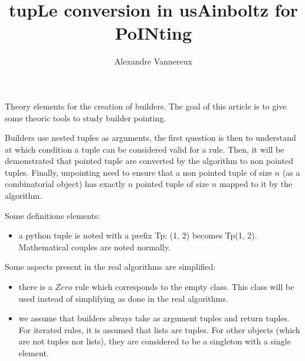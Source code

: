 \documentclass{article}
\title{tupLe conversion in usAinboltz for PoINting}
\author{Alexandre Vannereux}
\date{}
\begin{document}
\maketitle
Theory elements for the creation of builders. The goal of this article is to give some theoric tools to study builder pointing.

Builders use nested tuples as arguments, the first question is then to understand at which condition a tuple can be considered valid for a rule. Then, it will be demonstrated that pointed tuple are converted by the algorithm to non pointed tuples. Finally, unpointing need to ensure that a non pointed tuple of size $n$ (as a combinatorial object) has exactly $n$ pointed tuple of size $n$ mapped to it by the algorithm.

Some definitions elements:
\begin{itemize}
	\item a python tuple is noted with a prefix Tp: (1, 2) becomes Tp(1, 2).
	Mathematical couples are noted normally.
\end{itemize}

Some aspects present in the real algorithms are simplified:
\begin{itemize}
	\item there is a $Zero$ rule which corresponds to the empty class. This class will be used instead of simplifying as done in the real algorithms. 
	\item we assume that builders always take as argument tuples and return tuples. For iterated rules, it is assumed that lists are tuples. For other objects (which are not tuples nor lists), they are considered to be a singleton with a single element.
\end{itemize}
\end{document}
